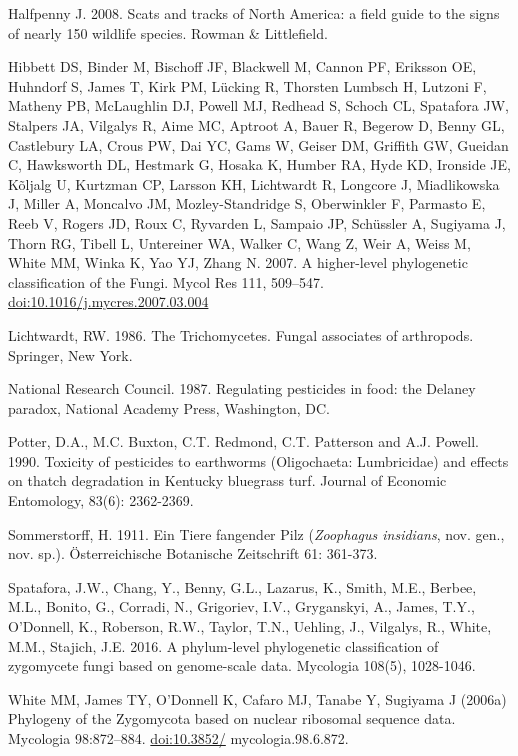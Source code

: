 \documentclass[]{book}
\begin{document}
Halfpenny J. 2008. Scats and tracks of North America: a field guide to
the signs of nearly 150 wildlife species. Rowman \& Littlefield.

Hibbett DS, Binder M, Bischoff JF, Blackwell M, Cannon PF, Eriksson OE,
Huhndorf S, James T, Kirk PM, Lücking R, Thorsten Lumbsch H, Lutzoni F,
Matheny PB, McLaughlin DJ, Powell MJ, Redhead S, Schoch CL, Spatafora
JW, Stalpers JA, Vilgalys R, Aime MC, Aptroot A, Bauer R, Begerow D,
Benny GL, Castlebury LA, Crous PW, Dai YC, Gams W, Geiser DM, Griffith
GW, Gueidan C, Hawksworth DL, Hestmark G, Hosaka K, Humber RA, Hyde KD,
Ironside JE, Kõljalg U, Kurtzman CP, Larsson KH, Lichtwardt R, Longcore
J, Miadlikowska J, Miller A, Moncalvo JM, Mozley-Standridge S,
Oberwinkler F, Parmasto E, Reeb V, Rogers JD, Roux C, Ryvarden L,
Sampaio JP, Schüssler A, Sugiyama J, Thorn RG, Tibell L, Untereiner WA,
Walker C, Wang Z, Weir A, Weiss M, White MM, Winka K, Yao YJ, Zhang N.
2007. A higher-level phylogenetic classification of the Fungi. Mycol Res
111, 509--547. \url{doi:10.1016/j.mycres.2007.03.004}

Lichtwardt, RW. 1986. The Trichomycetes. Fungal associates of
arthropods. Springer, New York.

National Research Council. 1987. Regulating pesticides in food: the
Delaney paradox, National Academy Press, Washington, DC.

Potter, D.A., M.C. Buxton, C.T. Redmond, C.T. Patterson and A.J. Powell.
1990. Toxicity of pesticides to earthworms (Oligochaeta: Lumbricidae)
and effects on thatch degradation in Kentucky bluegrass turf. Journal of
Economic Entomology, 83(6): 2362-2369.

Sommerstorff, H. 1911. Ein Tiere fangender Pilz (\emph{Zoophagus
insidians}, nov. gen., nov. sp.). Österreichische Botanische Zeitschrift
61: 361-373.

Spatafora, J.W., Chang, Y., Benny, G.L., Lazarus, K., Smith, M.E.,
Berbee, M.L., Bonito, G., Corradi, N., Grigoriev, I.V., Gryganskyi, A.,
James, T.Y., O'Donnell, K., Roberson, R.W., Taylor, T.N., Uehling, J.,
Vilgalys, R., White, M.M., Stajich, J.E. 2016. A phylum-level
phylogenetic classification of zygomycete fungi based on genome-scale
data. Mycologia 108(5), 1028-1046.

White MM, James TY, O'Donnell K, Cafaro MJ, Tanabe Y, Sugiyama J (2006a)
Phylogeny of the Zygomycota based on nuclear ribosomal sequence data.
Mycologia 98:872--884. \url{doi:10.3852/} mycologia.98.6.872.


\end{document}
